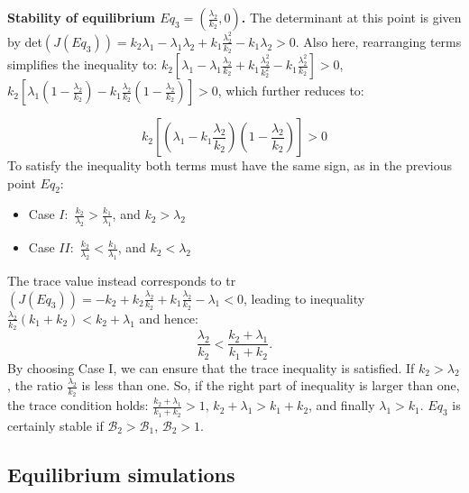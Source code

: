 \noindent\textbf{Stability of equilibrium $Eq_3=(\frac{\lambda_2}{k_2},0)$.} The determinant at this point is given by det$(J(Eq_3)) = k_2 \lambda_1 - \lambda_1 \lambda_2 + k_1 \frac{\lambda_2^2}{k_2} - k_1 \lambda_2 > 0 $. Also here, rearranging terms simplifies the inequality to: $k_2 [\lambda_1 -\lambda_1 \frac{\lambda_2}{k_2} + k_1 \frac{\lambda_2^2}{k_2^2} - k_1 \frac{\lambda_2^2}{k_2}] >0$, $ k_2 [\lambda_1 ( 1 -  \frac{\lambda_2}{k_2}) - k_1 \frac{\lambda_2}{k_2} (1 - \frac{\lambda_2}{k_2})] >0$, which further reduces to:

\[
 k_2 [(\lambda_1 - k_1 \frac{\lambda_2}{k_2})(1 - \frac{\lambda_2}{k_2})] >0
\]
To satisfy the inequality both terms must have the same sign, as in the previous point $Eq_2$:
\begin{itemize}
	\item Case $I:$ $\frac{k_2}{\lambda_2} > \frac{k_1}{\lambda_1} $, and $k_2 > \lambda_2$
 	\item Case $II:$ $\frac{k_2}{\lambda_2} < \frac{k_1}{\lambda_1} $, and $k_2 < \lambda_2$
\end{itemize}
The trace value instead corresponds to tr$(J(Eq_3)) = - k_2 + k_2 \frac{\lambda_2}{k_2} + k_1 \frac{\lambda_2}{k_2} - \lambda_1 < 0$, leading to inequality 
$ \frac{\lambda_2}{k_2} (k_1 + k_2) < k_2 + \lambda_1 $ and hence:
\[ \frac{\lambda_2}{k_2} < \frac{k_2 +\lambda_1}{k_1 + k_2}.\]
By choosing Case I, we can ensure that the trace inequality is satisfied. If $k_2 > \lambda_2$, the ratio $\frac{\lambda_2}{k_2}$ is less than one. So, if the right part of inequality is larger than one, the trace condition holds: $\frac{k_2 +\lambda_1}{k_1 + k_2} > 1$, $k_2 +\lambda_1 > k_1 + k_2 $, and finally $\lambda_1 > k_1$. $Eq_3$ is certainly stable if $\mathcal{B}_2> \mathcal{B}_1$, $\mathcal{B}_2 > 1$.  
 
\subsection{Equilibrium simulations}

